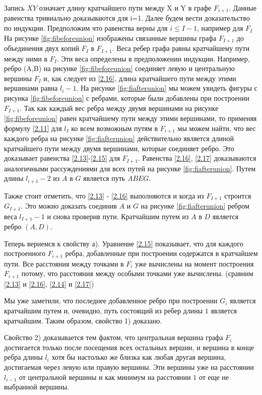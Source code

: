 \documentclass[a4paper, 14pt]{extarticle}
\numberwithin{equation}{section}
\begin{document}
Запись $\overline {XY}$ означает длину кратчайшего пути между X и Y в графе $F_{i+1}$. Данные равенства тривиально доказываются для i=1. Далее будем вести доказательство по индукции. Предположим что равенства верны для $i \leqslant I-1$, например для $F_I$ На рисунке \ref{fig:fibeforeunion} изображены связанные вершины графа $F_{I+1}$ до объединения двух копий $F_I$ в $F_{I+1}$. Веса ребер графа равны кратчайшему пути между ними в $F_I$. Эти веса определены в предположении индукции. Например, ребро (A,B) на рисунке \ref{fig:fibeforeunion} соединяет левую и центральную вершины $F_I$ и, как следует из \eqref{2.16}, длина кратчайшего пути между этими вершинами равна $l_i-1$. На рисунке \ref{fig:fiafterunion} мы можем увидеть фигуры с рисунка \ref{fig:fibeforeunion} с ребрами, которые были добавлены при построении $F_{I+1}$. Так как каждый вес ребра между двумя вершинами на рисунке \ref{fig:fibeforeunion} равен кратчайшему пути между этими вершинами, то применяя формулу \eqref{2.11} для $l_I$ ко всем возможным путям в $F_{i+1}$ мы можем найти, что вес каждого ребра на рисунке \ref{fig:fiafterunion}  действительно является длиной кратчайшего пути между двумя вершинами, которые соединяет ребро. Это доказывает равенства \ref{2.13}-\ref{2.15} для $F_{I+1}$. Равенства \ref{2.16}, \ref{2.17} доказываются аналогичными рассуждениями для всех путей на рисунке \ref{fig:fiafterunion}. Путем длины $l_{i+1}-2$ из $A$ в $G$ является путь $ABEG$.

Также стоит отметить, что  \ref{2.13} - \ref{2.16} выполняются и когда из $F_{I+1}$ строится $G_{I+1}$. Это можно доказать соединив $A$ и $G$ на рисунке \ref{fig:fiafterunion} ребром веса $l_{I+1}-1$ и снова проверив пути. Кратчайшим путем из $A$ в $D$ является ребро $(A,D)$.

Теперь вернемся к свойству а). Уравнение \eqref{2.15} показывает, что для каждого построенного $F_{i+1}$ ребра, добавленные при построении содержатся в кратчайшем пути. Все расстояния между точками в $F_i$ уже вычислены на момент построения $F_{i+1}$ потому, что расстояния между особыми точками уже вычислены. (сравним \eqref{2.13} и \eqref{2.16}, \eqref{2.14} и \eqref{2.17})

Мы уже заметили, что последнее добавленное ребро при построении $G_i$ является кратчайшим путем и, очевидно, путь состоящий из ребер длины $1$ является кратчайшим. Таким образом, свойство 1) доказано.

Свойство 2) доказывается тем фактом, что центральная вершина графа $F_i$ достигается только после посещения всех остальных вершин, и вершина в конце ребра длины $l_i$ хотя бы настолько же близка как любая другая вершина, достигаемая через левую или правую вершины. Эти вершины уже на расстоянии $l_{i-1}$ от центральной вершины и как минимум на расстоянии $1$ от еще не выбранной вершины. \\
\end{document}
